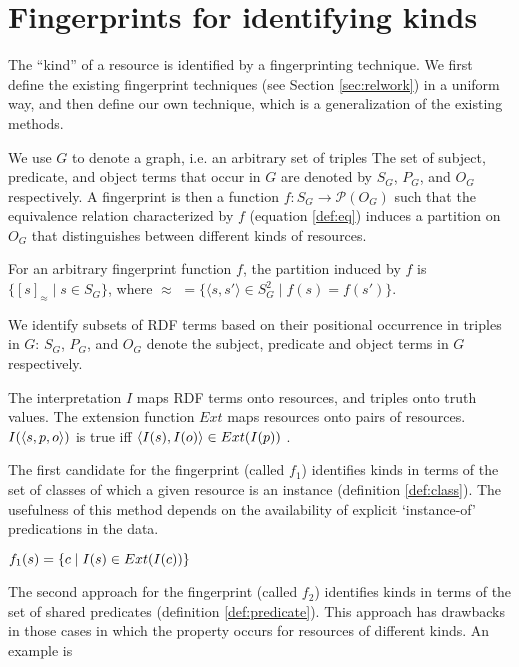 \section{Fingerprints for identifying kinds}
\label{sec:fingerprints}

The ``kind'' of a resource is identified by a fingerprinting technique.
We first define the existing fingerprint techniques
 (see Section \ref{sec:relwork})
 in a uniform way, and then define our own technique,
 which is a generalization of the existing methods.

We use $G$ to denote a graph, i.e. an arbitrary set of triples
The set of subject, predicate, and object terms that occur in $G$
 are denoted by $S_G$, $P_G$, and $O_G$ respectively.
A fingerprint is then a function $f : S_G \rightarrow \mathcal{P}(O_G)$
 such that the equivalence relation characterized by $f$
 (equation \ref{def:eq}) induces a partition on $O_G$
 that distinguishes between different kinds of resources.

\begin{definition}
  \label{def:eq}
  For an arbitrary fingerprint function $f$,
   the partition induced by $f$ is $\{ [s]_{\approx} \mid s \in S_G \}$,
   where $\approx \,\, = \{ \langle s, s' \rangle \in S_G^2 \mid f(s) = f(s') \}$.
\end{definition}

We identify subsets of RDF terms based on
  their positional occurrence in triples in $G$:
  $S_G$, $P_G$, and $O_G$ denote the subject, predicate and object terms
  in $G$ respectively.

The interpretation $I$ maps RDF terms onto resources,
  and triples onto truth values.
The extension function $Ext$ maps resources onto pairs of resources.
$I(\langle s,p,o\rangle)$ is true iff
  $\langle I(s),I(o)\rangle \in Ext(I(p))$ \cite{Hayes2014}.

The first candidate for the fingerprint (called $f_1$)
 identifies kinds in terms of the set of classes
 of which a given resource is an instance (definition \ref{def:class}).
The usefulness of this method depends on
 the availability of explicit `instance-of' predications in the data.

\begin{definition}
  \label{def:class}
  $f_1(s) = \\
  \{ c \mid I(s) \in Ext(I(c)) \}$
\end{definition}

The second approach for the fingerprint (called $f_2$)
 identifies kinds in terms of the set of shared predicates
 (definition \ref{def:predicate}).
This approach has drawbacks in those cases in which the property occurs
 for resources of different kinds.
An example is 

